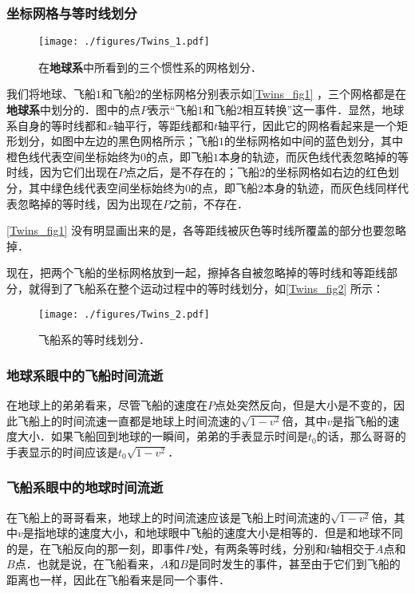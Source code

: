 \subsubsection{坐标网格与等时线划分}

\begin{figure}[ht]
\centering
\texttt{[image: ./figures/Twins\_1.pdf]}
\caption{在\textbf{地球系}中所看到的三个惯性系的网格划分．} \label{Twins_fig1}
\end{figure}

我们将地球、飞船$1$和飞船$2$的坐标网格分别表示如\autoref{Twins_fig1} ，三个网格都是在\textbf{地球系}中划分的．图中的点$P$表示“飞船$1$和飞船$2$相互转换”这一事件．显然，地球系自身的等时线都和$x$轴平行，等距线都和$t$轴平行，因此它的网格看起来是一个矩形划分，如图中左边的黑色网格所示；飞船$1$的坐标网格如中间的蓝色划分，其中橙色线代表空间坐标始终为$0$的点，即飞船$1$本身的轨迹，而灰色线代表忽略掉的等时线，因为它们出现在$P$点之后，是不存在的；飞船$2$的坐标网格如右边的红色划分，其中绿色线代表空间坐标始终为$0$的点，即飞船$2$本身的轨迹，而灰色线同样代表忽略掉的等时线，因为出现在$P$之前，不存在．

\autoref{Twins_fig1} 没有明显画出来的是，各等距线被灰色等时线所覆盖的部分也要忽略掉．

现在，把两个飞船的坐标网格放到一起，擦掉各自被忽略掉的等时线和等距线部分，就得到了飞船系在整个运动过程中的等时线划分，如\autoref{Twins_fig2} 所示：

\begin{figure}[ht]
\centering
\texttt{[image: ./figures/Twins\_2.pdf]}
\caption{飞船系的等时线划分．} \label{Twins_fig2}
\end{figure}

\subsubsection{地球系眼中的飞船时间流逝}

在地球上的弟弟看来，尽管飞船的速度在$P$点处突然反向，但是大小是不变的，因此飞船上的时间流速一直都是地球上时间流速的$\sqrt{1-v^2}$倍，其中$v$是指飞船的速度大小．如果飞船回到地球的一瞬间，弟弟的手表显示时间是$t_0$的话，那么哥哥的手表显示的时间应该是$t_0\sqrt{1-v^2}$．

\subsubsection{飞船系眼中的地球时间流逝}

在飞船上的哥哥看来，地球上的时间流速应该是飞船上时间流速的$\sqrt{1-v^2}$倍，其中$v$是指地球的速度大小，和地球眼中飞船的速度大小是相等的．但是和地球不同的是，在飞船反向的那一刻，即事件$P$处，有两条等时线，分别和$t$轴相交于$A$点和$B$点．也就是说，在飞船看来，$A$和$B$是同时发生的事件，甚至由于它们到飞船的距离也一样，因此在飞船看来是同一个事件．

